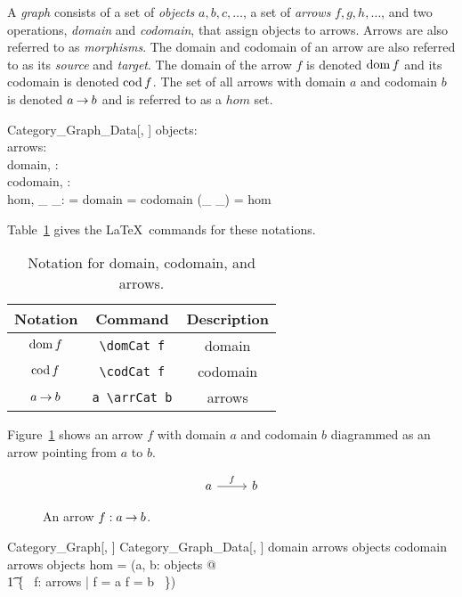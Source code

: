 \documentclass{amsart}
\begin{document}
A \textit{graph} consists of a set of \textit{objects} $a, b, c, \dots$, a set of \textit{arrows} $f, g, h, \dots$, 
and two operations, \textit{domain} and \textit{codomain}, that assign objects to arrows.
Arrows are also referred to as \textit{morphisms}.
The domain and codomain of an arrow are also referred to as its \textit{source} and \textit{target}.
The domain of the arrow $f$ is denoted $\operatorname{dom} f$
and its codomain is denoted $\operatorname{cod} f$.
The set of all arrows with domain $a$ and codomain $b$ is denoted $a \mathbin{\rightarrow} b$ and is referred to as a $hom$ set.
\begin{schema}{Category\_Graph\_Data}[\genO, \genA]
	objects: \power \genO \\
	arrows: \power \genA \\
	domain, \domCat: \genA \rel \genO \\
	codomain, \codCat: \genA \rel \genO \\
	hom, \_ \arrCat \_: \genO \cross \genO \rel \power \genA
\where
	\domCat = domain
\also
	\codCat = codomain
\also
	(\_ \arrCat \_) = hom
\end{schema}

Table~\ref{table:category_graph_notation} gives the \LaTeX\ commands for these notations.

\begin{table}[h!]
\centering
\begin{tabular}{|c|c|c|}
\hline
Notation		& Command		& Description \\
\hline
$\operatorname{dom} f$	& \verb|\domCat f|	& domain \\
$\operatorname{cod} f$	& \verb|\codCat f|	& codomain \\
$a \mathbin{\rightarrow} b$	& \verb|a \arrCat b|	& arrows \\
\hline
\end{tabular}
\vspace{1ex}
\caption{Notation for domain, codomain, and arrows.}
\label{table:category_graph_notation}
\end{table}

Figure~\ref{fig:f_a_b} shows
an arrow $f$ with domain $a$ and codomain $b$ diagrammed as an arrow pointing from $a$ to $b$.
\begin{figure}[h!]
$$
 \begin{tikzcd}
	a \arrow{r}{f} & b 
\end{tikzcd}
$$
\caption{An arrow $f: a \mathbin{\rightarrow} b$.}
\label{fig:f_a_b}
\end{figure}

\begin{schema}{Category\_Graph}[\genO, \genA]
	Category\_Graph\_Data[\genO, \genA]
\where
	domain \in arrows \fun objects
\also
	codomain \in arrows \fun objects
\also
	hom = (\lambda a, b: objects @ \\
	\t1	\{~ f: arrows | \domCat f = a \land \codCat f = b ~\})
\end{schema}
\end{document}
